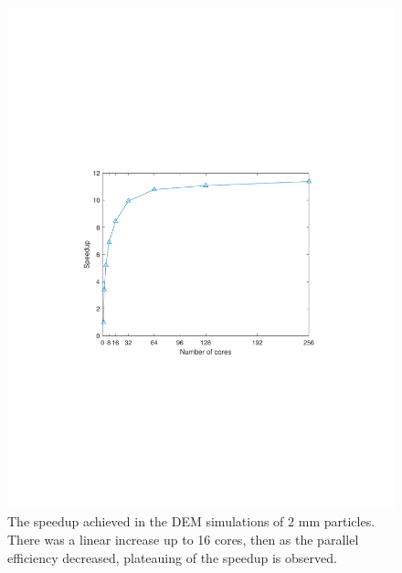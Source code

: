 \documentclass[preprint,11pt,authoryear]{elsarticle}
\begin{document}
\begin{figure}
\centering
\includegraphics[scale=0.75]{rslsts_2mm_DEM_speedup_mtlb.pdf}
\caption{The speedup achieved in the DEM simulations of 2 mm particles. There 
was a linear increase up to 16 cores, then as the parallel 
efficiency decreased, plateauing of the speedup is observed.}
\label{fig:rslts_DEM_speedup}
\end{figure}
\end{document}
